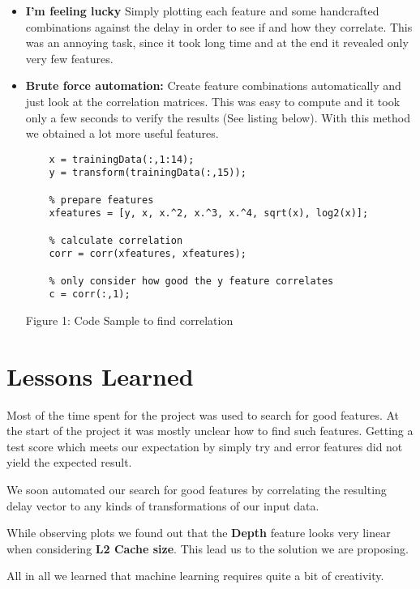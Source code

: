 \documentclass[a4paper, 11pt]{article}
\begin{document}
\begin{itemize}
	\item \textbf{I'm feeling lucky} Simply plotting each feature and some handcrafted combinations against the delay in order to see if and how they correlate. This was an annoying task, since it took long time and at the end it revealed only very few features.

	\item \textbf{Brute force automation:} Create feature combinations automatically and just look at the correlation matrices. This was easy to compute and it took only a few seconds to verify the results (See listing below). With this method we obtained a lot more useful features.
	\begin{center}
	\begin{lstlisting} 
	x = trainingData(:,1:14);
	y = transform(trainingData(:,15));

	% prepare features
	xfeatures = [y, x, x.^2, x.^3, x.^4, sqrt(x), log2(x)];

	% calculate correlation
	corr = corr(xfeatures, xfeatures);

	% only consider how good the y feature correlates
	c = corr(:,1);
	\end{lstlisting}
	Figure 1: Code Sample to find correlation
	\end{center}

\end{itemize}

\section{Lessons Learned} 
Most of the time spent for the project was used to search for good features. At the start of the project  it was mostly unclear how to find such features. Getting a test score which meets our expectation by simply try and error features did not yield the expected result.

We soon automated our search for good features by correlating the resulting delay vector to any kinds of transformations of our input data.

While observing plots we found out that the \textbf{Depth} feature looks very linear when considering \textbf{L2 Cache size}. This lead us to the solution we are proposing.

All in all we learned that machine learning requires quite a bit of creativity.

\end{document}
